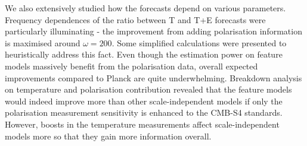 We also extensively studied how the forecasts depend on various parameters. Frequency dependences of the ratio between T and T+E forecasts were particularly illuminating - the improvement from adding polarisation information is maximised around $\omega = 200$. Some simplified calculations were presented to heuristically address this fact. Even though the estimation power on feature models massively benefit from the polarisation data, overall expected improvements compared to Planck are quite underwhelming. Breakdown analysis on temperature and polarisation contribution revealed that the feature models would indeed improve more than other scale-independent models if only the polarisation measurement sensitivity is enhanced to the CMB-S4 standards. However, boosts in the temperature measurements affect scale-independent models more so that they gain more information overall.